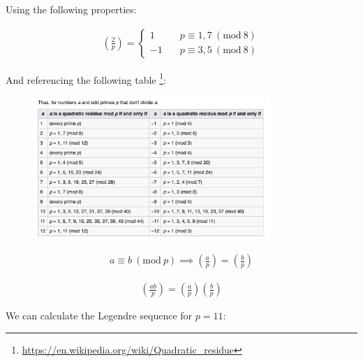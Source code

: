 \documentclass{article}
\newcommand{\modwos}[1]{\ (\mathrm{mod}\ #1)}
\begin{document}
Using the following properties:

\begin{align*}
    \left(\frac{2}{p}\right) = 
    \begin{cases}
        1 \quad &p \equiv 1, 7 \modwos{8} \\
        -1 \quad &p \equiv 3, 5 \modwos{8}
    \end{cases}\tag{1}
\end{align*}

And referencing the following table
\footnote{
    \url{https://en.wikipedia.org/wiki/Quadratic_residue}
}:

\begin{figure}[H]
    \centering
    \includegraphics[width=0.8\textwidth]{HW3_img/quadratic_residue.png}
\end{figure}



\begin{align*}
    a \equiv b \modwos{p} \implies \left(\frac{a}{p}\right) = \left(\frac{b}{p}\right) \tag{2}
\end{align*}

\begin{align*}
    \left(\frac{ab}{p}\right) = \left(\frac{a}{p}\right) \left(\frac{b}{p}\right) \tag{3}
\end{align*}

We can calculate the Legendre sequence for $p = 11$:
\end{document}
